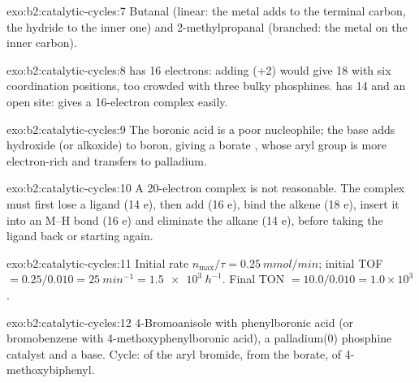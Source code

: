 \begin{solution}{exo:b2:catalytic-cycles:7}
Butanal  (linear: the metal adds to the terminal carbon, the hydride to
the inner one) and 2-methylpropanal  (branched: the metal on the inner
carbon).
\end{solution}

\begin{solution}{exo:b2:catalytic-cycles:8}
 has 16 electrons: adding  (+2) would give 18 with six
coordination positions, too crowded with three bulky phosphines.  has 14
and an open site:  gives a 16-electron complex easily.
\end{solution}

\begin{solution}{exo:b2:catalytic-cycles:9}
The boronic acid is a poor nucleophile; the base adds hydroxide (or alkoxide) to boron,
giving a borate , whose aryl group is more electron-rich and transfers to
palladium.
\end{solution}

\begin{solution}{exo:b2:catalytic-cycles:10}
A 20-electron complex is not reasonable. The complex must first lose a ligand (14 e), then
add  (16 e), bind the alkene (18 e), insert it into an M--H bond (16 e) and eliminate the
alkane (14 e), before taking the ligand back or starting again.
\end{solution}

\begin{solution}{exo:b2:catalytic-cycles:11}
Initial rate $n_{\max}/\tau = \qty{0.25}{mmol/min}$; initial TOF $= 0.25/0.010 =
\qty{25}{min^{-1}} = \qty{1.5e3}{h^{-1}}$. Final TON $= 10.0/0.010 = 1.0 \times 10^3$.
\end{solution}

\begin{solution}{exo:b2:catalytic-cycles:12}
4-Bromoanisole with phenylboronic acid (or bromobenzene with 4-methoxyphenylboronic acid),
a palladium(0) phosphine catalyst and a base. Cycle:  of the
aryl bromide,  from the borate,  of
4-methoxybiphenyl.
\end{solution}

